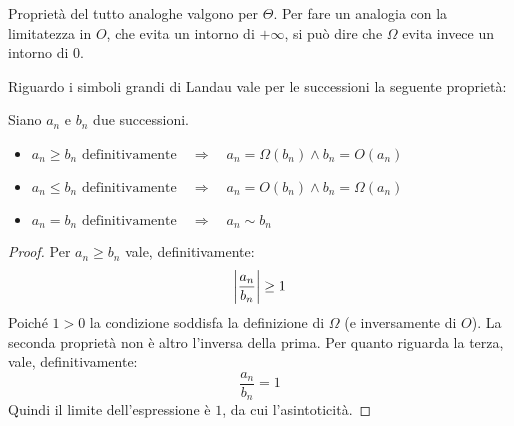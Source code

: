 Proprietà del tutto analoghe valgono per $\Theta$. Per fare un analogia con la limitatezza in $O$, che evita un intorno di $+\infty$, si può dire che $\Omega$ evita invece un intorno di $0$.

Riguardo i simboli grandi di Landau vale per le successioni la seguente proprietà:
\begin{prop}
	\label{suc:glelandau}
	Siano $a_n$ e $b_n$ due successioni.
	\begin{itemize}
		\item $a_n\geq b_n \text{ definitivamente}\quad\Rightarrow\quad a_n=\Omega(b_n)\land b_n=O(a_n)$
		\item $a_n\leq b_n \text{ definitivamente}\quad\Rightarrow\quad a_n=O(b_n)\land b_n=\Omega(a_n)$
		\item $a_n=b_n \text{ definitivamente}\quad\Rightarrow\quad a_n\sim b_n$
	\end{itemize}
\end{prop}
\begin{proof}
	Per $a_n\geq b_n$ vale, definitivamente:
	\[
		\left\lvert \frac{a_n}{b_n} \right\rvert\geq 1
	\]
	Poiché $1>0$ la condizione soddisfa la definizione di $\Omega$ (e inversamente di $O$). La seconda proprietà non è altro l'inversa della prima. Per quanto riguarda la terza, vale, definitivamente:
	\[
		\frac{a_n}{b_n}=1
	\]
	Quindi il limite dell'espressione è $1$, da cui l'asintoticità.
\end{proof}


